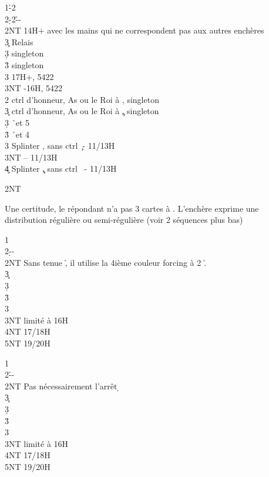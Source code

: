 \documentclass[a4paper]{article}
\begin{document}
\begin{bidtable}
1\h-2\c\\
2\d-2\h--\\
2NT \> 14H+ avec les mains qui ne correspondent pas aux autres enchères\+\\
3\c \> Relais\+\\
3\d \> singleton \c \\
3\h \> singleton \s \\
3\s \> 17H+, 5422\\
3NT -16H, 5422\-\-\\
2\s \> ctrl d’honneur, As ou le Roi à \s , singleton \c \\
3\c \> ctrl d’honneur, As ou le Roi à \c , singleton \s \\
3\d {} \h\ et 5 \d \\
3\h {} \h\ et 4 \d \\
3\s \> Splinter \s , sans ctrl \c\ - 11/13H\\
3NT  – 11/13H\\
4\c \> Splinter \c , sans ctrl \s\ - 11/13H
\end{bidtable}

\begin{bidtable}
2NT
\end{bidtable}

Une certitude, le répondant n’a pas 3 cartes à \s . 
L’enchère exprime une distribution régulière ou semi-régulière (voir 2 séquences plus bas)

\begin{bidtable}
1\c\\
2\d--\\
2NT \> Sans tenue \h , il utilise la 4ième couleur forcing à 2 \h .\+\\
3\c {}\\
3\d {}\\
3\h {}\\
3\s {}\\
3NT  limité à 16H\\
4NT  17/18H\\
5NT  19/20H\-
\end{bidtable}

\begin{bidtable}
1\c\\
2\h--\\
2NT \> Pas nécessairement l’arrêt \d \+\\
3\c {}\\
3\d {}\\
3\h {}\\
3\s {}\\
3NT  limité à 16H\\
4NT  17/18H\\
5NT  19/20H\-
\end{bidtable}
\end{document}

